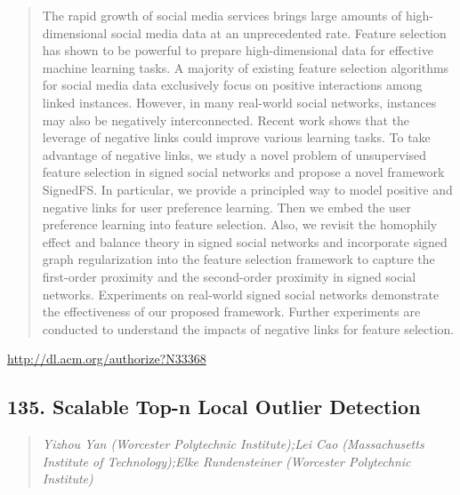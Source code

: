 \documentclass{article}
\begin{document}
\begin{quote}
The rapid growth of social media services brings large amounts of high-dimensional social media data at an unprecedented rate. Feature selection has shown to be powerful to prepare high-dimensional data for effective machine learning tasks. A majority of existing feature selection algorithms for social media data exclusively focus on positive interactions among linked instances. However, in many real-world social networks, instances may also be negatively interconnected. Recent work shows that the leverage of negative links could improve various learning tasks. To take advantage of negative links, we study a novel problem of unsupervised feature selection in signed social networks and propose a novel framework SignedFS. In particular, we provide a principled way to model positive and negative links for user preference learning. Then we embed the user preference learning into feature selection. Also, we revisit the homophily effect and balance theory in signed social networks and incorporate signed graph regularization into the feature selection framework to capture the first-order proximity and the second-order proximity in signed social networks. Experiments on real-world signed social networks demonstrate the effectiveness of our proposed framework. Further experiments are conducted to understand the impacts of negative links for feature selection.
\end{quote}

\href{http://dl.acm.org/authorize?N33368}{http://dl.acm.org/authorize?N33368}

\subsection{135. Scalable Top-n Local Outlier Detection}

\begin{quote}
\footnotesize{\textit{Yizhou Yan (Worcester Polytechnic Institute);Lei Cao (Massachusetts Institute of Technology);Elke Rundensteiner (Worcester Polytechnic Institute)}}

\end{quote}
\end{document}
